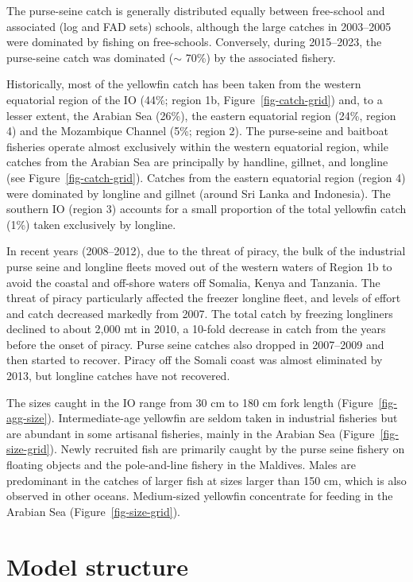 \documentclass[
]{scrartcl}
\begin{document}
The purse-seine catch is generally distributed equally between
free-school and associated (log and FAD sets) schools, although the
large catches in 2003--2005 were dominated by fishing on free-schools.
Conversely, during 2015--2023, the purse-seine catch was dominated
(\(\sim\) 70\%) by the associated fishery.

Historically, most of the yellowfin catch has been taken from the
western equatorial region of the IO (44\%; region 1b,
Figure~\ref{fig-catch-grid}) and, to a lesser extent, the Arabian Sea
(26\%), the eastern equatorial region (24\%, region 4) and the
Mozambique Channel (5\%; region 2). The purse-seine and baitboat
fisheries operate almost exclusively within the western equatorial
region, while catches from the Arabian Sea are principally by handline,
gillnet, and longline (see Figure~\ref{fig-catch-grid}). Catches from
the eastern equatorial region (region 4) were dominated by longline and
gillnet (around Sri Lanka and Indonesia). The southern IO (region 3)
accounts for a small proportion of the total yellowfin catch (1\%) taken
exclusively by longline.

In recent years (2008--2012), due to the threat of piracy, the bulk of
the industrial purse seine and longline fleets moved out of the western
waters of Region 1b to avoid the coastal and off-shore waters off
Somalia, Kenya and Tanzania. The threat of piracy particularly affected
the freezer longline fleet, and levels of effort and catch decreased
markedly from 2007. The total catch by freezing longliners declined to
about 2,000 mt in 2010, a 10-fold decrease in catch from the years
before the onset of piracy. Purse seine catches also dropped in
2007--2009 and then started to recover. Piracy off the Somali coast was
almost eliminated by 2013, but longline catches have not recovered.

The sizes caught in the IO range from 30 cm to 180 cm fork length
(Figure~\ref{fig-agg-size}). Intermediate-age yellowfin are seldom taken
in industrial fisheries but are abundant in some artisanal fisheries,
mainly in the Arabian Sea (Figure~\ref{fig-size-grid}). Newly recruited
fish are primarily caught by the purse seine fishery on floating objects
and the pole-and-line fishery in the Maldives. Males are predominant in
the catches of larger fish at sizes larger than 150 cm, which is also
observed in other oceans. Medium-sized yellowfin concentrate for feeding
in the Arabian Sea (Figure~\ref{fig-size-grid}).

\section{Model structure}\label{model-structure}
\end{document}
